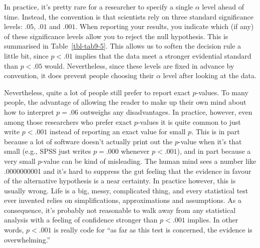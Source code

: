 \documentclass[
  a4paper,
]{book}
\begin{document}
In practice, it's pretty rare for a researcher to specify a single
\(\alpha\) level ahead of time. Instead, the convention is that
scientists rely on three standard significance levels: \(.05\), \(.01\)
and \(.001\). When reporting your results, you indicate which (if any)
of these significance levels allow you to reject the null hypothesis.
This is summarised in Table~\ref{tbl-tab9-5}. This allows us to soften
the decision rule a little bit, since \(p < .01\) implies that the data
meet a stronger evidential standard than \(p < .05\) would.
Nevertheless, since these levels are fixed in advance by convention, it
does prevent people choosing their \(\alpha\) level after looking at the
data.

\begin{table}

\caption{\label{tbl-tab9-5}Typical translations of \(p\)-value levels}

\centering
{}

\end{table}%

Nevertheless, quite a lot of people still prefer to report exact
\(p\)-values. To many people, the advantage of allowing the reader to
make up their own mind about how to interpret \(p = .06\) outweighs any
disadvantages. In practice, however, even among those researchers who
prefer exact \(p\)-values it is quite common to just write \(p < .001\)
instead of reporting an exact value for small \(p\). This is in part
because a lot of software doesn't actually print out the \(p\)-value
when it's that small (e.g., SPSS just writes \(p = .000\) whenever
\(p < .001\)), and in part because a very small \(p\)-value can be kind
of misleading. The human mind sees a number like .0000000001 and it's
hard to suppress the gut feeling that the evidence in favour of the
alternative hypothesis is a near certainty. In practice however, this is
usually wrong. Life is a big, messy, complicated thing, and every
statistical test ever invented relies on simplifications, approximations
and assumptions. As a consequence, it's probably not reasonable to walk
away from any statistical analysis with a feeling of confidence stronger
than \(p < .001\) implies. In other words, \(p < .001\) is really code
for ``as far as this test is concerned, the evidence is overwhelming.''
\end{document}
